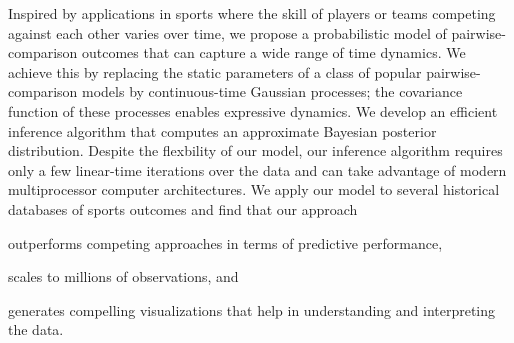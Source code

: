 Inspired by applications in sports where the skill of players or teams competing against each other varies over time, we propose a probabilistic model of pairwise-comparison outcomes that can capture a wide range of time dynamics.
We achieve this by replacing the static parameters of a class of popular pairwise-comparison models by continuous-time Gaussian processes;
the covariance function of these processes enables expressive dynamics.
We develop an efficient inference algorithm that computes an approximate Bayesian posterior distribution.
Despite the flexbility of our model, our inference algorithm requires only a few linear-time iterations over the data and can take advantage of modern multiprocessor computer architectures.
We apply our model to several historical databases of sports outcomes and find that our approach
\begin{enuminline}
\item outperforms competing approaches in terms of predictive performance,
\item scales to millions of observations, and
\item generates compelling visualizations that help in understanding and interpreting the data.
\end{enuminline}
